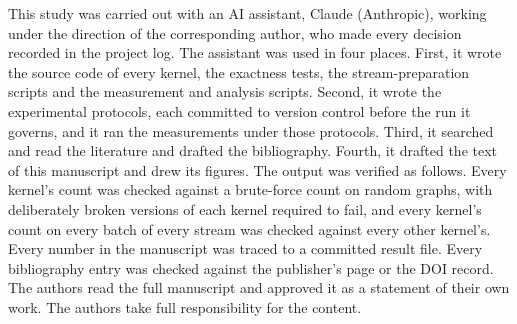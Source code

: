 This study was carried out with an AI assistant, Claude (Anthropic), working under the direction of the corresponding author, who made every decision recorded in the project log.
The assistant was used in four places.
First, it wrote the source code of every kernel, the exactness tests, the stream-preparation scripts and the measurement and analysis scripts.
Second, it wrote the experimental protocols, each committed to version control before the run it governs, and it ran the measurements under those protocols.
Third, it searched and read the literature and drafted the bibliography.
Fourth, it drafted the text of this manuscript and drew its figures.
The output was verified as follows.
Every kernel's count was checked against a brute-force count on random graphs, with deliberately broken versions of each kernel required to fail, and every kernel's count on every batch of every stream was checked against every other kernel's.
Every number in the manuscript was traced to a committed result file.
Every bibliography entry was checked against the publisher's page or the DOI record.
The authors read the full manuscript and approved it as a statement of their own work.
The authors take full responsibility for the content.
